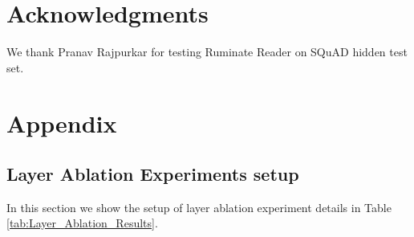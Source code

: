 \documentclass[11pt,letterpaper]{article}
\begin{document}
\section*{Acknowledgments}
We thank Pranav Rajpurkar for testing Ruminate Reader on SQuAD hidden test set.



\appendix
\section{Appendix}

\subsection{Layer Ablation Experiments setup} \label{ssec:layer_ablation_setup}
In this section we show the setup of layer ablation experiment details in Table \ref{tab:Layer_Ablation_Results}. 
\end{document}
